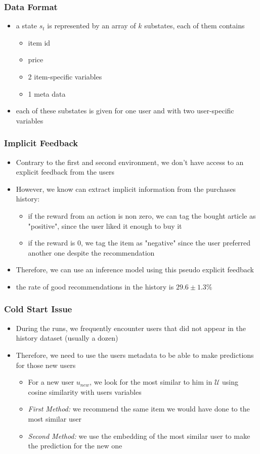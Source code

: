 \documentclass{beamer}
\begin{document}
\begin{frame}
	\frametitle{Data Format}
	\begin{itemize}
	\item a state $s_t$ is represented by an array of $k$ substates, each of them contains
	\begin{itemize}
		\item item id
		\item price
		\item 2 item-specific variables
		\item 1 meta data
	\end{itemize}
	\item each of these substates is given for one user and with two user-specific variables
	\end{itemize}
\end{frame}


\begin{frame}
	\frametitle{Implicit Feedback}
	\begin{itemize}
	\item Contrary to the first and second environment, we don't have access to an explicit feedback from the users
	\item However, we know can extract implicit information from the purchases history:
	\begin{itemize}
		\item if the reward from an action is non zero, we can tag the bought article as "positive", since the user liked it enough to buy it
		\item if the reward is 0, we tag the item as "negative" since the user preferred another one despite the recommendation 
	\end{itemize}
	\item Therefore, we can use an inference model using this pseudo explicit feedback
	\item the rate of good recommendations in the history is 
	$29.6 \pm 1.3 \%$
	\end{itemize}
\end{frame}

\begin{frame}
	\frametitle{Cold Start Issue}
	\begin{itemize}
		\item During the runs, we frequently encounter users that did not appear in the history dataset (usually a dozen)
		\item Therefore, we need to use the users metadata to be able to make predictions for those new users
		\begin{itemize}
			\item For a new user $u_{new}$, we look for the most similar to him in $\mathcal{U}$ using cosine similarity with users variables
			\item \textit{First Method:} we recommend the same item we would have done to the most similar user
			\item \textit{Second Method:} we use the embedding of the most similar user to make the prediction for the new one
		\end{itemize}
	\end{itemize}
\end{frame}
\end{document}
